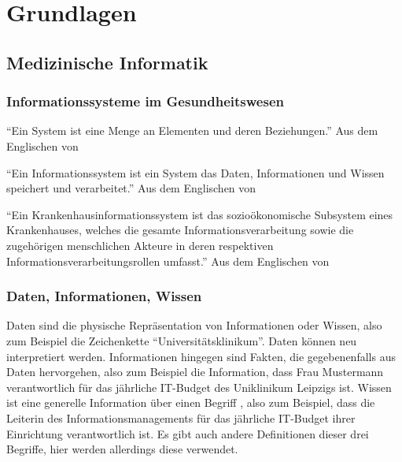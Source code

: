 \chapter{Grundlagen}\label{ch:preliminaries}

\section{Medizinische Informatik}

\subsection{Informationssysteme im Gesundheitswesen}

\begin{definition}[System]
\enquote{Ein System ist eine Menge an Elementen und deren Beziehungen.}
Aus dem Englischen von \citet[S.~30]{bb}
\end{definition}
\begin{definition}[Informationssystem]
\enquote{Ein Informationssystem ist ein System das Daten, Informationen und Wissen speichert und verarbeitet.}
Aus dem Englischen von \citet[S.~30]{bb}
\end{definition}

\begin{definition}
\enquote{Ein Krankenhausinformationssystem ist das sozioökonomische Subsystem eines Krankenhauses, welches die gesamte Informationsverarbeitung sowie die zugehörigen menschlichen Akteure in deren respektiven Informationsverarbeitungsrollen umfasst.}
Aus dem Englischen von \citet[S.~37]{bb}
\end{definition}

\subsection{Daten, Informationen, Wissen}
Daten sind die physische Repräsentation von Informationen oder Wissen, also zum Beispiel die Zeichenkette \enquote{Universitätsklinikum}.
Daten können neu interpretiert werden.
Informationen hingegen sind Fakten, die gegebenenfalls aus Daten hervorgehen, also zum Beispiel die Information, dass Frau Mustermann verantwortlich für das jährliche IT-Budget des Uniklinikum Leipzigs ist.
Wissen ist eine generelle Information über einen Begriff \citep[S.~29]{bb}, also zum Beispiel, dass die Leiterin des Informationsmanagements für das jährliche IT-Budget ihrer Einrichtung verantwortlich ist.
Es gibt auch andere Definitionen dieser drei Begriffe, hier werden allerdings diese verwendet.

